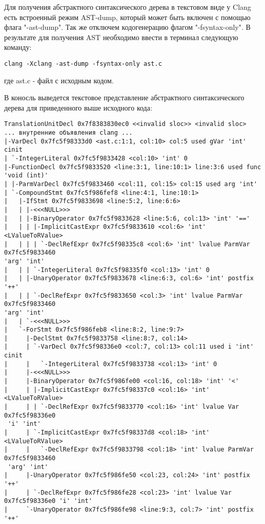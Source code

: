 Для получения абстрактного синтаксического дерева в текстовом виде у Clang есть встроенный 
режим AST-dump, который может быть включен с помощью флага "-ast-dump". Так же отключем кодогенерацию
флагом "-fsyntax-only". В результате для получения AST необходимо ввести в терминал следующую команду:
\begin{lstlisting}
clang -Xclang -ast-dump -fsyntax-only ast.c
\end{lstlisting}
где ast.c - файл с исходным кодом.

В коносль выведется текстовое представление абстрактного синтаксического дерева для приведенного выше исходного кода:
\begin{lstlisting}[basicstyle=\tiny]
TranslationUnitDecl 0x7f8383830ec0 <<invalid sloc>> <invalid sloc>
... внутренние объявления clang ...
|-VarDecl 0x7fc5f98333d0 <ast.c:1:1, col:10> col:5 used gVar 'int' cinit
| `-IntegerLiteral 0x7fc5f9833428 <col:10> 'int' 0
|-FunctionDecl 0x7fc5f9833520 <line:3:1, line:10:1> line:3:6 used func 'void (int)'
| |-ParmVarDecl 0x7fc5f9833460 <col:11, col:15> col:15 used arg 'int'
| `-CompoundStmt 0x7fc5f986fef8 <line:4:1, line:10:1>
|   |-IfStmt 0x7fc5f9833698 <line:5:2, line:6:6>
|   | |-<<<NULL>>>
|   | |-BinaryOperator 0x7fc5f9833628 <line:5:6, col:13> 'int' '=='
|   | | |-ImplicitCastExpr 0x7fc5f9833610 <col:6> 'int' <LValueToRValue>
|   | | | `-DeclRefExpr 0x7fc5f98335c8 <col:6> 'int' lvalue ParmVar 0x7fc5f9833460
'arg' 'int'
|   | | `-IntegerLiteral 0x7fc5f98335f0 <col:13> 'int' 0
|   | |-UnaryOperator 0x7fc5f9833678 <line:6:3, col:6> 'int' postfix '++'
|   | | `-DeclRefExpr 0x7fc5f9833650 <col:3> 'int' lvalue ParmVar 0x7fc5f9833460
'arg' 'int'
|   | `-<<<NULL>>>
|   `-ForStmt 0x7fc5f986feb8 <line:8:2, line:9:7>
|     |-DeclStmt 0x7fc5f9833758 <line:8:7, col:14>
|     | `-VarDecl 0x7fc5f98336e0 <col:7, col:13> col:11 used i 'int' cinit
|     |   `-IntegerLiteral 0x7fc5f9833738 <col:13> 'int' 0
|     |-<<<NULL>>>
|     |-BinaryOperator 0x7fc5f986fe00 <col:16, col:18> 'int' '<'
|     | |-ImplicitCastExpr 0x7fc5f98337c0 <col:16> 'int' <LValueToRValue>
|     | | `-DeclRefExpr 0x7fc5f9833770 <col:16> 'int' lvalue Var 0x7fc5f98336e0
 'i' 'int'
|     | `-ImplicitCastExpr 0x7fc5f98337d8 <col:18> 'int' <LValueToRValue>
|     |   `-DeclRefExpr 0x7fc5f9833798 <col:18> 'int' lvalue ParmVar 0x7fc5f9833460
 'arg' 'int'
|     |-UnaryOperator 0x7fc5f986fe50 <col:23, col:24> 'int' postfix '++'
|     | `-DeclRefExpr 0x7fc5f986fe28 <col:23> 'int' lvalue Var 0x7fc5f98336e0 'i' 'int'
|     `-UnaryOperator 0x7fc5f986fe98 <line:9:3, col:7> 'int' postfix '++'

\end{lstlisting}
